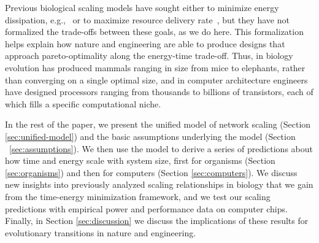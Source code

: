 \documentclass[12pt]{article}
\begin{document}
Previous biological scaling models have sought either to minimize energy dissipation, e.g.,~\cite{west97} or to maximize resource delivery rate~\cite{banavar10}, but they have
not formalized the trade-offs between these goals, as we do here.  This formalization
helps explain how nature and engineering are able to produce designs that
approach pareto-optimality along the energy-time trade-off.  Thus, in biology
evolution has produced mammals ranging in size from mice to elephants, rather
than converging on a single optimal size, and in computer architecture
engineers have designed processors ranging from thousands to
billions of transistors, each of which fills a specific computational niche.

In the rest of the paper, we present the unified model of network scaling
(Section \ref{sec:unified-model}) and the basic assumptions underlying the
model (Section ~\ref{sec:assumptions}).  We then use the model to derive a
series of predictions about how time and energy scale with system size, first
for organisms (Section \ref{sec:organisms}) and then for computers (Section
\ref{sec:computers}). We discuss new insights into previously analyzed
scaling relationships in biology that we gain from the time-energy minimization
framework, and we test our scaling predictions with empirical power and performance
data on computer chips.  Finally, in Section \ref{sec:discussion}  we discuss
the implications of these results for evolutionary transitions in nature and
engineering.
\end{document}
